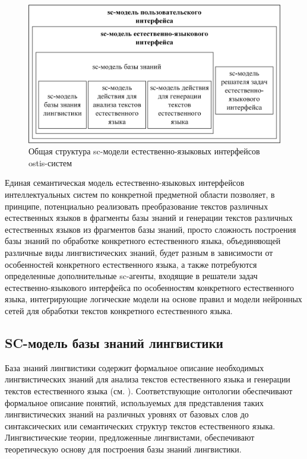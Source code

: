 \begin{figure}[H]
	\includegraphics[scale=0.8,width=1.0\textwidth]{images/part4/chapter_chinese/structure_interface.png}
	\caption{Общая структура sc-модели естественно-языковых интерфейсов ostis-систем}
	\label{fig:structure-sc-model-natural-interface}
\end{figure}

Единая семантическая модель естественно-языковых интерфейсов интеллектуальных систем по конкретной предметной области позволяет, в принципе, потенциально реализовать преобразование текстов различных естественных языков в фрагменты базы знаний и генерации текстов различных естественных языков из фрагментов базы знаний, просто сложность построения базы знаний по обработке конкретного естественного языка, объединяющей различные виды лингвистических знаний, будет разным в зависимости от особенностей конкретного естественного языка, а также потребуются определенные дополнительные sc-агенты, входящие в решатели задач естественно-языкового интерфейса по особенностям конкретного естественного языка, интегрирующие логические модели на основе правил и модели нейронных сетей для обработки текстов конкретного естественного языка.

\subsection{SC-модель базы знаний лингвистики}
База знаний лингвистики содержит формальное описание необходимых лингвистических знаний для анализа текстов естественного языка и генерации текстов естественного языка (см. ). Соответствующие онтологии обеспечивают формальное описание понятий, используемых для представления таких лингвистических знаний на различных уровнях от базовых слов до синтаксических или семантических структур текстов естественного языка. Лингвистические теории, предложенные лингвистами, обеспечивают теоретическую основу для построения базы знаний лингвистики. 

